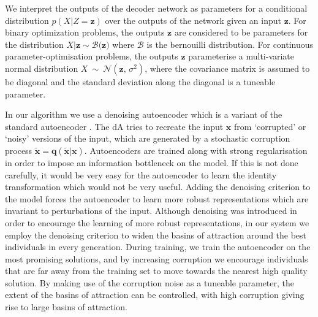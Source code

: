 \documentclass[runningheads,a4paper]{llncs}
\begin{document}
We interpret the outputs of the decoder network as parameters for a conditional distribution $p(X|Z=\mathbf{z})$ over the outputs of the network given an input $\mathbf{z}$. For binary optimization problems, the outputs $\mathbf{z}$ are considered to be parameters for the distribution $X|\mathbf{z} \sim \mathcal{B(\mathbf{z}})$ where $\mathcal{B}$ is the bernouilli distribution. For continuous parameter-optimisation problems, the outputs $\mathbf z$ parameterise a multi-variate normal distribution $X\ \sim\ \mathcal{N}(\mathbf{z},\,\sigma^2)$, where the covariance matrix is assumed to be diagonal and the standard deviation along the diagonal is a tuneable parameter.

In our algorithm we use a denoising autoencoder which is a variant of the standard autoencoder \cite{vincent2008extracting}. The dA tries to recreate the input $\mathbf x$ from `corrupted' or `noisy' versions of the input, which are generated by a stochastic corruption process $\mathbf{\tilde x = q(\tilde x|x)}$. Autoencoders are trained along with strong regularisation in order to impose an information bottleneck on the model. If this is not done carefully, it would be very easy for the autoencoder to learn the identity transformation which would not be very useful. Adding the denoising criterion to the model forces the autoencoder to learn more robust representations which are invariant to perturbations of the input. Although denoising was introduced in order to encourage the learning of more robust representations, in our system we employ the denoising criterion to widen the basins of attraction around the best individuals in every generation. During training, we train the autoencoder on the most promising solutions, and by increasing corruption we encourage individuals that are far away from the training set to move towards the nearest high quality solution. By making use of the corruption noise as a tuneable parameter, the extent of the basins of attraction can be controlled, with high corruption giving rise to large basins of attraction.



\end{document}

